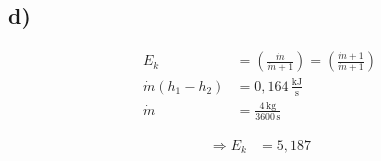 

\subsection*{d)}
\begin{align*}
    E_k &= \left( \frac{\dot{m}}{\dot{m} + 1} \right) = \left( \frac{\dot{m} + 1}{\dot{m} + 1} \right) \\
    \dot{m} \left( h_1 - h_2 \right) &= 0,164 \, \frac{\text{kJ}}{\text{s}} \\
    \dot{m} &= \frac{4 \, \text{kg}}{3600 \, \text{s}}
\end{align*}

\begin{align*}
    \Rightarrow E_k &= 5,187
\end{align*}